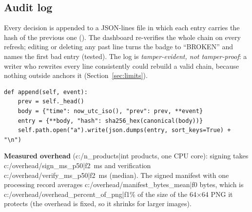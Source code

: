 \subsection{Audit log}
Every decision is appended to a JSON-lines file in which each entry carries the hash of the previous one (). The dashboard re-verifies the whole chain on every refresh; editing or deleting any past line turns the badge to ``BROKEN'' and names the first bad entry (tested). The log is \emph{tamper-evident, not tamper-proof}: a writer who rewrites every line consistently could rebuild a valid chain, because nothing outside anchors it (Section~\ref{sec:limits}).
\begin{lstlisting}[style=py]
def append(self, event):
    prev = self._head()
    body = {"time": now_utc_iso(), "prev": prev, **event}
    entry = {**body, "hash": sha256_hex(canonical(body))}
    self.path.open("a").write(json.dumps(entry, sort_keys=True) + "\n")
\end{lstlisting}
\textbf{Measured overhead} ({{c:/n_products|int}} products, one CPU core): signing takes {{c:/overhead/sign_ms_p50|f2}}~ms and verification {{c:/overhead/verify_ms_p50|f2}}~ms (median). The signed manifest with one processing record averages {{c:/overhead/manifest_bytes_mean|f0}} bytes, which is {{c:/overhead/overhead_percent_of_png|f1}}\% of the size of the 64$\times$64 PNG it protects (the overhead is fixed, so it shrinks for larger images).
